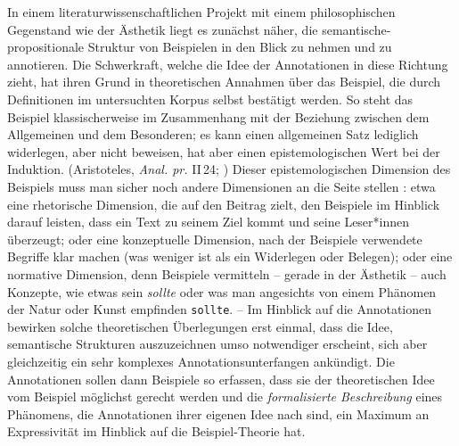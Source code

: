 \documentclass{article}
\renewcommand*{\see}{\autocap{v}gl\adddot}%
\begin{document}
In einem literaturwissenschaftlichen Projekt mit einem philosophischen
Gegenstand wie der Ästhetik liegt es zunächst näher, die
semantische-propositionale Struktur von Beispielen in den Blick zu
nehmen und zu annotieren. Die Schwerkraft, welche die Idee der
Annotationen in diese Richtung zieht, hat ihren Grund in theoretischen
Annahmen über das Beispiel, die durch Definitionen im untersuchten
Korpus selbst bestätigt werden. So steht das Beispiel klassischerweise
im Zusammenhang mit der Beziehung zwischen dem Allgemeinen und dem
Besonderen; es kann einen allgemeinen Satz lediglich widerlegen, aber
nicht beweisen, hat aber einen epistemologischen Wert bei der
Induktion. %
(Aristoteles, \emph{Anal. pr.} II\,24; \cite[\see][]{Willer2007a}) %
Dieser epistemologischen Dimension des Beispiels muss man sicher noch
andere Dimensionen an die Seite stellen \parencite{CL2013b}: etwa eine
rhetorische Dimension, die auf den Beitrag zielt, den Beispiele im
Hinblick darauf leisten, dass ein Text zu seinem Ziel kommt und seine
Leser*innen überzeugt; oder eine konzeptuelle Dimension, nach der
Beispiele verwendete Begriffe klar machen (was weniger ist als ein
Widerlegen oder Belegen); oder eine normative Dimension, denn
Beispiele vermitteln -- gerade in der Ästhetik -- auch Konzepte, wie
etwas sein \emph{sollte} oder was man angesichts von einem Phänomen
der Natur oder Kunst empfinden \texttt{sollte}. -- Im Hinblick auf die
Annotationen bewirken solche theoretischen Überlegungen erst einmal,
dass die Idee, semantische Strukturen auszuzeichnen umso notwendiger
erscheint, sich aber gleichzeitig ein sehr komplexes
Annotationsunterfangen ankündigt. Die Annotationen sollen dann
Beispiele so erfassen, dass sie der theoretischen Idee vom Beispiel
möglichst gerecht werden und die \emph{formalisierte Beschreibung}
eines Phänomens, die Annotationen ihrer eigenen Idee nach sind, ein
Maximum an Expressivität im Hinblick auf die Beispiel-Theorie hat.
\end{document}
